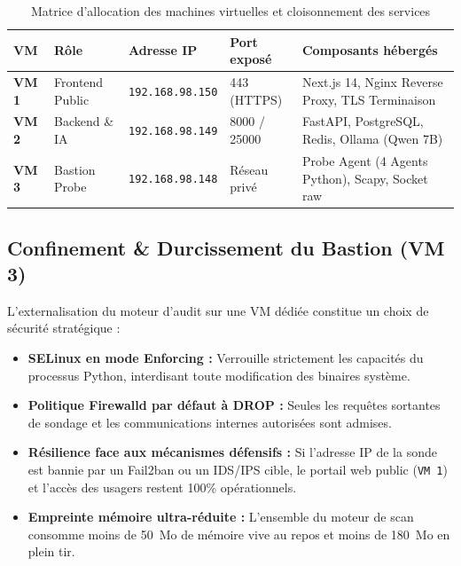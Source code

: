 \documentclass[11pt,a4paper,oneside]{article}
\begin{document}
\begin{table}[htbp]
\centering
\small
\renewcommand{\arraystretch}{1.1}
\begin{tabularx}{\textwidth}{llllX}
\toprule
\textbf{VM} & \textbf{Rôle} & \textbf{Adresse IP} & \textbf{Port exposé} & \textbf{Composants hébergés} \\
\midrule
\textbf{VM 1} & Frontend Public & \texttt{192.168.98.150} & 443 (HTTPS) & Next.js 14, Nginx Reverse Proxy, TLS Terminaison \\
\textbf{VM 2} & Backend \& IA & \texttt{192.168.98.149} & 8000 / 25000 & FastAPI, PostgreSQL, Redis, Ollama (Qwen 7B) \\
\textbf{VM 3} & Bastion Probe & \texttt{192.168.98.148} & Réseau privé & Probe Agent (4 Agents Python), Scapy, Socket raw \\
\bottomrule
\end{tabularx}
\caption{Matrice d'allocation des machines virtuelles et cloisonnement des services}
\end{table}

\subsection{Confinement \& Durcissement du Bastion (VM 3)}
L'externalisation du moteur d'audit sur une VM dédiée constitue un choix de sécurité stratégique :
\begin{itemize}
    \item \textbf{SELinux en mode Enforcing :} Verrouille strictement les capacités du processus Python, interdisant toute modification des binaires système.
    \item \textbf{Politique Firewalld par défaut à DROP :} Seules les requêtes sortantes de sondage et les communications internes autorisées sont admises.
    \item \textbf{Résilience face aux mécanismes défensifs :} Si l'adresse IP de la sonde est bannie par un Fail2ban ou un IDS/IPS cible, le portail web public (\texttt{VM 1}) et l'accès des usagers restent 100\% opérationnels.
    \item \textbf{Empreinte mémoire ultra-réduite :} L'ensemble du moteur de scan consomme moins de 50~Mo de mémoire vive au repos et moins de 180~Mo en plein tir.
\end{itemize}

\end{document}
